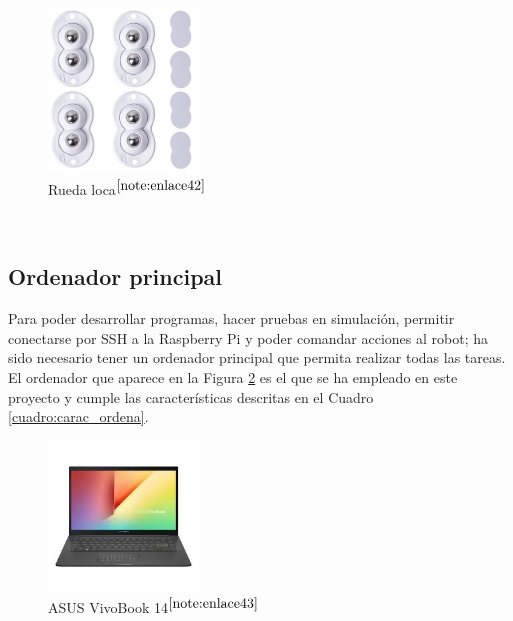 \begin{figure} [h!]
	\begin{center}
		\includegraphics[width=4cm]{figs/ruedaloca.png}
	\end{center}
	\caption{Rueda loca$^{\ref{note:enlace42}}$} 
	\label{fig:ruedaloca}
\end{figure}\

\setcounter{footnote}{42} %

\subsection{Ordenador principal}

Para poder desarrollar programas, hacer pruebas en simulación, permitir conectarse por SSH a la Raspberry Pi y poder comandar acciones al robot; ha sido necesario tener un ordenador principal que permita realizar todas las tareas. El ordenador que aparece en la Figura \ref{fig:ordenador} es el que se ha empleado en este proyecto y cumple las características descritas en el Cuadro \ref{cuadro:carac_ordena}.


\begin{figure} [h!]
	\begin{center}
		\includegraphics[width=4cm]{figs/ordenador.png}
	\end{center}
	\caption{ASUS VivoBook 14$^{\ref{note:enlace43}}$} 
	\label{fig:ordenador}
\end{figure}\

